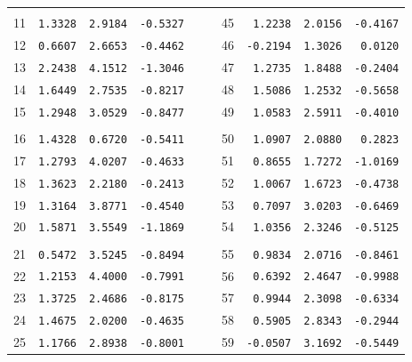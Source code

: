 \documentclass[a4paper]{article}
\theoremstyle{myexamplestyle}
\begin{document}
\begin{center}
\begin{table}[!h]
\begin{tabular}{rrrrrrrrrr}
\\
	&		&		&		&	&	&		&		&		&		\\
11	&	\texttt{1.3328}	&	\texttt{2.9184}	&	\texttt{-0.5327} 	&	&	&	45	&	\texttt{1.2238}	&	\texttt{2.0156}	&	\texttt{-0.4167} 
\\
12	&	\texttt{0.6607}	&	\texttt{2.6653}	&	\texttt{-0.4462} 	&	&	&	46	&	\texttt{-0.2194} 	&	\texttt{1.3026}	&	\texttt{0.0120}	\\
13	&	\texttt{2.2438}	&	\texttt{4.1512}	&	\texttt{-1.3046} 	&	&	&	47	&	\texttt{1.2735}	&	\texttt{1.8488}	&	\texttt{-0.2404}
\\
14	&	\texttt{1.6449}	&	\texttt{2.7535}	&	\texttt{-0.8217} 	&	&	&	48	&	\texttt{1.5086}	&	\texttt{1.2532}	&	\texttt{-0.5658}
\\
15	&	\texttt{1.2948}	&	\texttt{3.0529}	&	\texttt{-0.8477} 	&	&	&	49	&	\texttt{1.0583}	&	\texttt{2.5911}	&	\texttt{-0.4010}
\\
	&		&		&		&	&	&		&		&		&		
\\
16	&	\texttt{1.4328}	&	\texttt{0.6720}	&	\texttt{-0.5411} 	&	&	&	50	&	\texttt{1.0907}	&	\texttt{2.0880}	&	\texttt{0.2823}
\\
17	&	\texttt{1.2793}	&	\texttt{4.0207}	&	\texttt{-0.4633} 	&	&	&	51	&	\texttt{0.8655}	&	\texttt{1.7272}	&	\texttt{-1.0169}
\\
18	&	\texttt{1.3623}	&	\texttt{2.2180}	&	\texttt{-0.2413} 	&	&	&	52	&	\texttt{1.0067}	&	\texttt{1.6723}	&	\texttt{-0.4738}
\\
19	&	\texttt{1.3164}	&	\texttt{3.8771}	&	\texttt{-0.4540} 	&	&	&	53	&	\texttt{0.7097}	&	\texttt{3.0203}	&	\texttt{-0.6469}
\\
20	&	\texttt{1.5871}	&	\texttt{3.5549}	&	\texttt{-1.1869} 	&	&	&	54	&	\texttt{1.0356}	&	\texttt{2.3246}	&	\texttt{-0.5125}
\\
	&		&		&		&	&	&		&		&		&		
\\
21	&	\texttt{0.5472}	&	\texttt{3.5245}	&	\texttt{-0.8494} 	&	&	&	55	&	\texttt{0.9834}	&	\texttt{2.0716}	&	\texttt{-0.8461}
\\
22	&	\texttt{1.2153}	&	\texttt{4.4000}	&	\texttt{-0.7991} 	&	&	&	56	&	\texttt{0.6392}	&	\texttt{2.4647}	&	\texttt{-0.9988}
\\
23	&	\texttt{1.3725}	&	\texttt{2.4686}	&	\texttt{-0.8175} 	&	&	&	57	&	\texttt{0.9944}	&	\texttt{2.3098}	&	\texttt{-0.6334}
\\
24	&	\texttt{1.4675}	&	\texttt{2.0200}	&	\texttt{-0.4635} 	&	&	&	58	&	\texttt{0.5905}	&	\texttt{2.8343}	&	\texttt{-0.2944}
\\
25	&	\texttt{1.1766}	&	\texttt{2.8938}	&	\texttt{-0.8001} 	&	&	&	59	&	\texttt{-0.0507}	 &	\texttt{3.1692}	&	\texttt{-0.5449}

\end{tabular}
\end{table}
\end{center}
\end{document}
